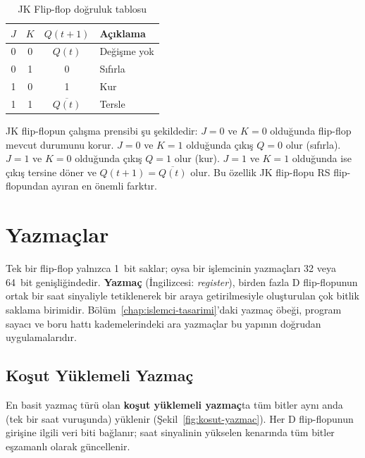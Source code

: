 \begin{table}[H]
\centering
\caption{JK Flip-flop doğruluk tablosu}
\label{tab:B.15}
\begin{tabular}{cc|c|l}
\toprule
$J$ & $K$ & $Q(t+1)$ & \textbf{Açıklama} \\
\midrule
0 & 0 & $Q(t)$ & Değişme yok \\
0 & 1 & 0 & Sıfırla \\
1 & 0 & 1 & Kur \\
1 & 1 & $\overline{Q(t)}$ & Tersle \\
\bottomrule
\end{tabular}
\end{table}

JK flip-flopun çalışma prensibi şu şekildedir: $J = 0$ ve $K = 0$ olduğunda flip-flop mevcut durumunu korur. $J = 0$ ve $K = 1$ olduğunda çıkış $Q = 0$ olur (sıfırla). $J = 1$ ve $K = 0$ olduğunda çıkış $Q = 1$ olur (kur). $J = 1$ ve $K = 1$ olduğunda ise çıkış tersine döner ve $Q(t+1) = \overline{Q(t)}$ olur. Bu özellik JK flip-flopu RS flip-flopundan ayıran en önemli farktır.


\section{Yazmaçlar}
\label{sec:ekB-yazmaclar}

Tek bir flip-flop yalnızca 1~bit saklar; oysa bir işlemcinin yazmaçları 32 veya 64~bit genişliğindedir. \textbf{Yazmaç} (İngilizcesi: \textit{register}), birden fazla D flip-flopunun ortak bir saat sinyaliyle tetiklenerek bir araya getirilmesiyle oluşturulan çok bitlik saklama birimidir. Bölüm~\ref{chap:islemci-tasarimi}'daki yazmaç öbeği, program sayacı ve boru hattı kademelerindeki ara yazmaçlar bu yapının doğrudan uygulamalarıdır.

\subsection{Koşut Yüklemeli Yazmaç}

En basit yazmaç türü olan \textbf{koşut yüklemeli yazmaç}ta tüm bitler aynı anda (tek bir saat vuruşunda) yüklenir (Şekil~\ref{fig:kosut-yazmac}). Her D flip-flopunun girişine ilgili veri biti bağlanır; saat sinyalinin yükselen kenarında tüm bitler eşzamanlı olarak güncellenir.

